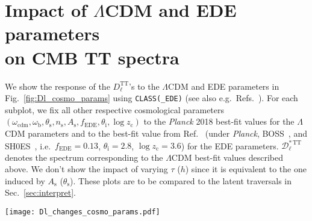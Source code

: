 \documentclass[aps, prd, reprint, superscriptaddress, nofootinbib, bibnotes]{revtex4-2}
\newcommand{\Planck}{\textit{Planck}}
\begin{document}
\section{Impact of $\Lambda$CDM and EDE parameters\\on CMB TT spectra}
\label{app:Dl_changes_cosmo_params}
We show the response of the $D_\ell^\mathrm{TT}$'s to the $\Lambda$CDM and EDE parameters in Fig.~\ref{fig:Dl_cosmo_params} using \texttt{CLASS(\_EDE)} (see also e.g.\ Refs.~\cite{WMAP:2008lyn, Kable:2020hcw}). For each subplot, we fix all other respective cosmological parameters $(\omega_\mathrm{cdm}, \omega_\mathrm{b}, \theta_\mathrm{s}, n_\mathrm{s}, A_\mathrm{s}, f_\mathrm{EDE}, \theta_\mathrm{i}, \log z_\mathrm{c} )$ to the \Planck{} 2018 best-fit values \cite{Planck:2018vyg} for the $\Lambda$CDM parameters and to the best-fit value from Ref.~\cite{Herold:2022iib} (under \Planck{}, BOSS~\cite{BOSS:2016wmc}, and SH0ES~\cite{Riess:2021jrx}, i.e.\ $f_\mathrm{EDE} = 0.13$, $\theta_\mathrm{i} = 2.8$, $\log z_\mathrm{c} = 3.6$) for the EDE parameters. $\mathcal{D}_\ell^\mathrm{*\,TT}$ denotes the spectrum corresponding to the $\Lambda$CDM best-fit values described above. We don't show the impact of varying $\tau$ ($h$) since it is equivalent to the one induced by $A_\mathrm{s}$ ($\theta_\mathrm{s}$). These plots are to be compared to the latent traversals in Sec.~\ref{sec:interpret}.
%
\begin{figure*}
    \centering
    \texttt{[image: Dl\_changes\_cosmo\_params.pdf]}
    \caption{Changes in CMB TT power spectra, $D_\ell^\mathrm{TT}$, induced by varying the conventional $\Lambda$CDM and EDE parameters in the ranges given in Tab.~\ref{tab:prior_lh}. Each parameter is varied one at a time, while keeping all others fixed (including the sound horizon scale). $\mathcal{D}_\ell^\mathrm{*\,TT}$ indicates the spectrum corresponding to the $\Lambda$CDM best-fit values described in Appendix~\ref{app:Dl_changes_cosmo_params}.
    }    \label{fig:Dl_cosmo_params}
\end{figure*}
\end{document}
